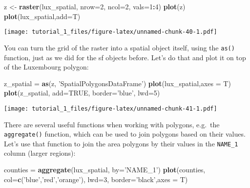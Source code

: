 \documentclass[]{article}
\newenvironment{Shaded}{\begin{snugshade}}{\end{snugshade}}
\newcommand{\DataTypeTok}[1]{\textcolor[rgb]{0.13,0.29,0.53}{#1}}
\newcommand{\DecValTok}[1]{\textcolor[rgb]{0.00,0.00,0.81}{#1}}
\newcommand{\KeywordTok}[1]{\textcolor[rgb]{0.13,0.29,0.53}{\textbf{#1}}}
\newcommand{\NormalTok}[1]{#1}
\newcommand{\OperatorTok}[1]{\textcolor[rgb]{0.81,0.36,0.00}{\textbf{#1}}}
\newcommand{\OtherTok}[1]{\textcolor[rgb]{0.56,0.35,0.01}{#1}}
\newcommand{\StringTok}[1]{\textcolor[rgb]{0.31,0.60,0.02}{#1}}
\begin{document}
\begin{Shaded}
\begin{Highlighting}[]
\NormalTok{z <-}\StringTok{ }\KeywordTok{raster}\NormalTok{(lux_spatial, }\DataTypeTok{nrow=}\DecValTok{2}\NormalTok{, }\DataTypeTok{ncol=}\DecValTok{2}\NormalTok{, }\DataTypeTok{vals=}\DecValTok{1}\OperatorTok{:}\DecValTok{4}\NormalTok{)}
\KeywordTok{plot}\NormalTok{(z)}
\KeywordTok{plot}\NormalTok{(lux_spatial,}\DataTypeTok{add=}\NormalTok{T)}
\end{Highlighting}
\end{Shaded}

\texttt{[image: tutorial\_1\_files/figure-latex/unnamed-chunk-40-1.pdf]}

You can turn the grid of the raster into a spatial object itself, using
the \texttt{as()} function, just as we did for the sf objects before.
Let's do that and plot it on top of the Luxembourg polygon:

\begin{Shaded}
\begin{Highlighting}[]
\NormalTok{z_spatial =}\StringTok{ }\KeywordTok{as}\NormalTok{(z, }\StringTok{'SpatialPolygonsDataFrame'}\NormalTok{)}
\KeywordTok{plot}\NormalTok{(lux_spatial,}\DataTypeTok{axes =}\NormalTok{ T)}
\KeywordTok{plot}\NormalTok{(z_spatial, }\DataTypeTok{add=}\OtherTok{TRUE}\NormalTok{, }\DataTypeTok{border=}\StringTok{'blue'}\NormalTok{, }\DataTypeTok{lwd=}\DecValTok{5}\NormalTok{)}
\end{Highlighting}
\end{Shaded}

\texttt{[image: tutorial\_1\_files/figure-latex/unnamed-chunk-41-1.pdf]}

There are several useful functions when working with polygons, e.g.~the
\texttt{aggregate()} function, which can be used to join polygons based
on their values. Let's use that function to join the area polygons by
their values in the \texttt{NAME\_1} column (larger regions):

\begin{Shaded}
\begin{Highlighting}[]
\NormalTok{counties =}\StringTok{ }\KeywordTok{aggregate}\NormalTok{(lux_spatial, }\DataTypeTok{by=}\StringTok{'NAME_1'}\NormalTok{)}
\KeywordTok{plot}\NormalTok{(counties, }\DataTypeTok{col=}\KeywordTok{c}\NormalTok{(}\StringTok{'blue'}\NormalTok{,}\StringTok{'red'}\NormalTok{,}\StringTok{'orange'}\NormalTok{), }\DataTypeTok{lwd=}\DecValTok{3}\NormalTok{, }\DataTypeTok{border=}\StringTok{'black'}\NormalTok{,}\DataTypeTok{axes =}\NormalTok{ T)}
\end{Highlighting}
\end{Shaded}
\end{document}
